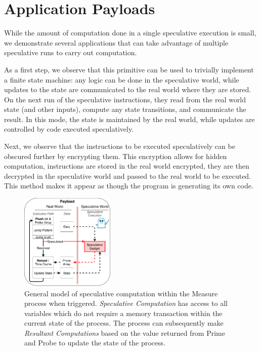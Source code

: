 
\section{Application Payloads}

While the amount of computation done in a single speculative execution is small,
we demonstrate several applications that can take advantage of multiple
speculative runs to carry out computation.

As a first step, we observe that this primitive can be used to trivially
implement a finite state machine: any logic can be done in the speculative
world, while updates to the state are communicated to the real world where they
are stored. On the next run of the speculative instructions, they read from the
real world state (and other inputs), compute any state transitions, and
communicate the result. In this mode, the state is maintained by the real world,
while updates are controlled by code executed speculatively.

Next, we observe that the instructions to be executed speculatively can be
obscured further by encrypting them. This encryption allows for hidden
computation, instructions are stored in the real world encrypted, they are then
decrypted in the speculative world and passed to the real world to be executed.
This method makes it appear as though the program is generating its own code.

\begin{figure}[t]
    \centering
        \includegraphics[width=0.4\textwidth]{figures/general_model}
    \caption{ General model of speculative computation within the Measure 
        process when triggered. \textit{Speculative Computation} has access
        to all variables which do not require a memory transaction within
        the current state of the process. The process can subsequently make
        \textit{Resultant Computations} based on the value returned from 
        Prime and Probe to update the state of the process. }
    \label{fig:general_model}
\end{figure}


